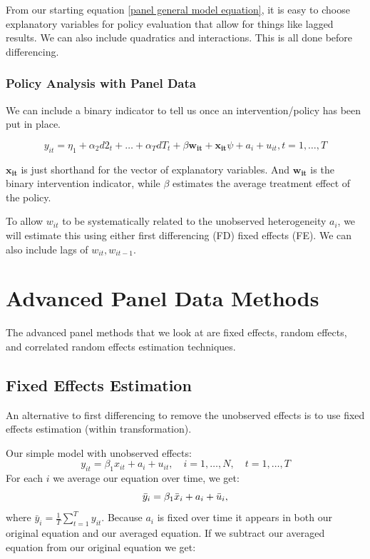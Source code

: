 \documentclass[11pt]{article}
\begin{document}
From our starting equation \eqref{panel general model equation}, it is easy to choose explanatory variables for policy evaluation that allow for things like lagged results. We can also include quadratics and interactions. This is all done before differencing.

\subsubsection{Policy Analysis with Panel Data}

We can include a binary indicator to tell us once an intervention/policy has been put in place.

\begin{equation}
y_{i t}=\eta_1+\alpha_2 d 2_t+\ldots+\alpha_T d T_t+\beta \boldsymbol{w_{it}}+ \boldsymbol{x_{it}} \psi+a_i+u_{i t}, t = 1,\ldots, T
\end{equation}

$\boldsymbol{x_{it}}$ is just shorthand for the vector of explanatory variables. And $\boldsymbol{w_{it}}$ is the binary intervention indicator, while $\beta$ estimates the average treatment effect of the policy.

To allow $w_{it}$ to be systematically related to the unobserved heterogeneity $a_i$, we will estimate this using either first differencing (FD) fixed effects (FE). We can also include lags of $w_{it}, w_{it-1}$.


\newpage
\section{Advanced Panel Data Methods}

The advanced panel methods that we look at are fixed effects, random effects, and correlated random effects estimation techniques.

\subsection{Fixed Effects Estimation}
An alternative to first differencing to remove the unobserved effects is to use fixed effects estimation (within transformation).

Our simple model with unobserved effects:
\[y_{it} = \beta_1 x_{it} + a_i + u_{it}, \quad i = 1,\ldots, N, \quad t = 1,\ldots, T\]
 For each $i$ we average our equation over time, we get:
 \[\Bar{y}_i = \beta_1 \bar{x}_i + a_i + \bar{u}_i,\]
 where $\bar{y}_i = \frac{1}{T}\sum_{t=1}^T y_{it}$. Because $a_i$ is fixed over time it appears in both our original equation and our averaged equation. If we subtract our averaged equation from our original equation we get:
\end{document}
